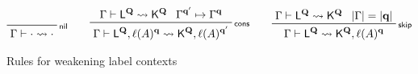 \documentclass[acmsmall,screen,review]{acmart}
\newcommand{\mb}[1]{\ensuremath{\mathbf{#1}}}
\newcommand{\ms}[1]{\ensuremath{\mathsf{#1}}}
\newcommand{\cwk}[2]{#1 \mapsto #2}
\newcommand{\lwk}[3]{#1 \vdash #2 \rightsquigarrow #3}
\newcommand{\lhyp}[2]{#1(#2)}
\newcommand{\rle}[1]{{\scriptsize\textsf{#1}}}
\begin{document}
\begin{figure}
  \begin{adjustbox}{minipage=1.1\textwidth,scale=0.9}
  \begin{gather*}
    \prftree[r]{\rle{nil}}{\lwk{\Gamma}{\cdot}{\cdot}} \qquad 
    \prftree[r]{\rle{cons}}
      {\lwk{\Gamma}{\ms{L}^{\mb{Q}}}{\ms{K}^{\mb{Q}}}}
      {\cwk{\Gamma^{\mb{q}'}}{\Gamma^{\mb{q}}}}
      {\lwk{\Gamma}{\ms{L}^{\mb{Q}}, \lhyp{\ell}{A}^{\mb{q}}}
      {\ms{K}^{\mb{Q}}, \lhyp{\ell}{A}^{\mb{q}'}}} \qquad
    \prftree[r]{\rle{skip}}
      {\lwk{\Gamma}{\ms{L}^{\mb{Q}}}{\ms{K}^{\mb{Q}}}}
      {|\Gamma| = |\mb{q}|}
      {\lwk{\Gamma}{\ms{L}^{\mb{Q}}}{\ms{K}^{\mb{Q}}, \lhyp{\ell}{A}^{\mb{q}}}}
  \end{gather*}
  \end{adjustbox}
  \caption{Rules for weakening label contexts}
  \Description{}
  \label{fig:label-wk}
\end{figure}
\end{document}
